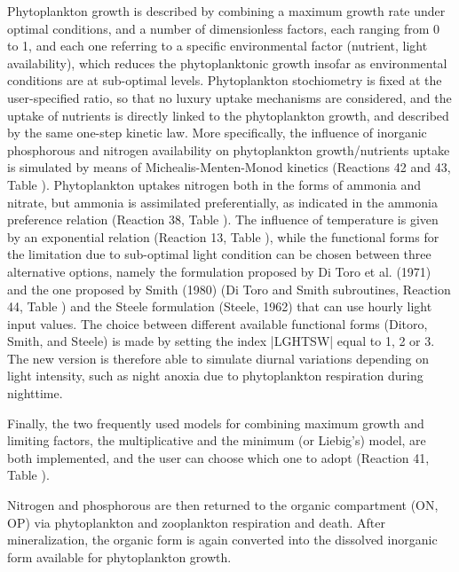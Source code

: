 Phytoplankton growth is described by combining a maximum growth 
rate under optimal conditions, and a number of dimensionless 
factors, each ranging from 0 to 1, and each one referring to 
a specific environmental factor (nutrient, light availability), 
which reduces the phytoplanktonic growth insofar as environmental 
conditions are at sub-optimal levels. Phytoplankton stochiometry 
is fixed at the user-specified ratio, so that no luxury uptake 
mechanisms are considered, and the uptake of nutrients is directly 
linked to the phytoplankton growth, and described by the same 
one-step kinetic law. More specifically, the influence of inorganic 
phosphorous and nitrogen availability on phytoplankton growth/nutrients 
uptake is simulated by means of Michealis-Menten-Monod kinetics 
(Reactions 42 and 43, Table \Ttwoa). Phytoplankton uptakes nitrogen 
both in the forms of ammonia and nitrate, but ammonia is assimilated 
preferentially, as indicated in the ammonia preference relation 
(Reaction 38, Table \Ttwoa). The influence of temperature is given 
by an exponential relation (Reaction 13, Table \Ttwoa), while the 
functional forms for the limitation due to sub-optimal light 
condition can be chosen between three alternative options, namely 
the formulation proposed by Di Toro et al. (1971) and the one 
proposed by Smith (1980) (Di Toro and Smith subroutines, Reaction 
44, Table \Ttwoa) and the Steele formulation (Steele, 1962) that 
can use hourly light input values. The 
choice between different available functional forms (Ditoro, 
Smith, and Steele) is made by setting the index |LGHTSW| equal 
to 1, 2 or 3. The new version is therefore able to simulate diurnal 
variations depending on light intensity, such as night anoxia 
due to phytoplankton respiration during nighttime.

Finally, the two frequently used models for combining maximum 
growth and limiting factors, the multiplicative and the minimum 
(or Liebig's) model, are both implemented, and the user can choose 
which one to adopt (Reaction 41, Table \Ttwoa).

Nitrogen and phosphorous are then returned to the organic compartment 
(ON, OP) via phytoplankton and zooplankton respiration and death. 
After mineralization, the organic form is again converted into
the dissolved inorganic form available for phytoplankton growth. 

